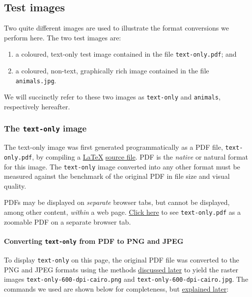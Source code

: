 \documentclass[
  11pt,
  british,
  a4paper,
]{article}
\providecommand{\tightlist}{%
  \setlength{\itemsep}{0pt}\setlength{\parskip}{0pt}}
\begin{document}
\hypertarget{test-images}{%
\subsection{Test images}\label{test-images}}

Two quite different images are used to illustrate the format conversions
we perform here. The two test images are:

\begin{enumerate}
\tightlist
\item
  a coloured, text-only test image contained in the file
  \texttt{text-only.pdf}; and
\item
  a coloured, non-text, graphically rich image contained in the file
  \texttt{animals.jpg}.
\end{enumerate}

We will succinctly refer to these two images as \texttt{text-only} and
\texttt{animals}, respectively hereafter.

\hypertarget{the-text-only-image}{%
\subsubsection{\texorpdfstring{The \texttt{text-only}
image}{The text-only image}}\label{the-text-only-image}}

The text-only image was first generated programmatically as a PDF file,
\texttt{text-only.pdf}, by compiling a
\href{https://www.latex-project.org/}{LaTeX}
\href{auxiliary/text-only.tex}{source file}. PDF is the \emph{native} or
natural format for this image. The \texttt{text-only} image converted
into any other format must be measured against the benchmark of the
original PDF in file size and visual quality.

PDFs may be displayed on \emph{separate} browser tabs, but cannot be
displayed, among other content, \emph{within} a web page.
\href{images/text-only.pdf}{Click here} to see \texttt{text-only.pdf} as
a zoomable PDF on a separate browser tab.

\hypertarget{converting-text-only-from-pdf-to-png-and-jpeg}{%
\paragraph{\texorpdfstring{Converting \texttt{text-only} from PDF to PNG
and
JPEG}{Converting text-only from PDF to PNG and JPEG}}\label{converting-text-only-from-pdf-to-png-and-jpeg}}

To display \texttt{text-only} on this page, the original PDF file was
converted to the PNG and JPEG formats using the methods
\protect\hyperlink{vector-to-raster}{discussed later} to yield the
raster images \texttt{text-only-600-dpi-cairo.png} and
\texttt{text-only-600-dpi-cairo.jpg}. The commands we used are shown
below for completeness, but
\protect\hyperlink{pdf-to-png-and-jpeg-poppler-and-cairo}{explained
later}:
\end{document}

